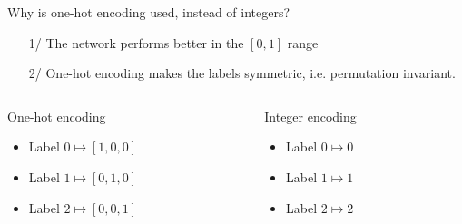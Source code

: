 \documentclass[xcolor=pdftex,dvipsnames,table,mathserif]{beamer}
\begin{document}
\begin{frame}{}

\begin{quizzblock}{Why is one-hot encoding used, instead of integers?}
  \begin{itemize}
  \item[1/ ] The network performs better in the $[0,1]$ range
  \item[2/ ] One-hot encoding makes the labels symmetric, i.e. permutation invariant.
  \end{itemize}
\end{quizzblock}

  \vspace{1em}

  \begin{columns}
    \begin{column}{.5\textwidth}
  \begin{block}{One-hot encoding}
    \begin{itemize}
    \item
      Label $0 \longmapsto [1,0,0]$
    \item
      Label $1 \longmapsto [0,1,0]$
    \item
      Label $2 \longmapsto [0,0,1]$
    \end{itemize}
  \end{block}

    \end{column}

    \begin{column}{.5\textwidth}
  \begin{block}{Integer encoding}
    \begin{itemize}
    \item
      Label $0 \longmapsto 0$
    \item
      Label $1 \longmapsto 1$
    \item
      Label $2 \longmapsto 2$
    \end{itemize}
  \end{block}

    \end{column}
  \end{columns}

  \pause

  \vspace{1em}


\end{frame}
\end{document}

